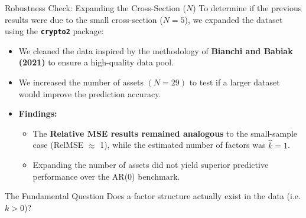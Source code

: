 \documentclass{beamer}
\begin{document}
\begin{frame}{Robustness Check: Expanding the Cross-Section ($N$)}
    To determine if the previous results were due to the small cross-section ($N=5$), we expanded the dataset using the \textbf{\texttt{crypto2}} package:
    
    \begin{itemize}
        \item We cleaned the data inspired by the methodology of \textbf{Bianchi and Babiak (2021)} to ensure a high-quality data pool.
        \item We increased the number of assets $(N = 29)$ to test if a larger dataset would improve the prediction accuracy.
        \item \textbf{Findings:} 
        \begin{itemize}
            \item The \textbf{Relative MSE results remained analogous} to the small-sample case (RelMSE $\approx$ 1), while the estimated number of factors was $\hat{k} = 1$.
            \item Expanding the number of assets did not yield superior predictive performance over the AR(0) benchmark.
        \end{itemize}
    \end{itemize}

    \begin{block}{The Fundamental Question}
        Does a factor structure actually exist in the data (i.e. $k > 0$)? 
    \end{block}
    \end{frame}
    
\end{document}

